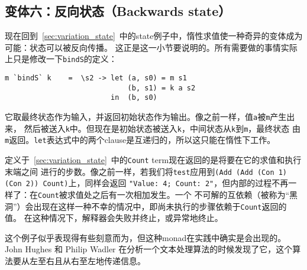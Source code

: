 \documentclass[12pt]{article}
\begin{document}
\subsection{变体六：反向状态（Backwards state）}
现在回到~\ref{sec:variation_state}~中的state例子中，惰性求值使一种奇异的变体成为可能：状态可以被反向传播。
这正是这一小节要说明的。所有需要做的事情实际上只是修改一下\texttt{bindS}的定义：
\begin{verbatim}
m `bindS` k    =  \s2 -> let (a, s0) = m s1
                             (b, s1) = k a s2
                         in  (b, s0)
\end{verbatim}
\noindent{}它取最终状态作为输入，并返回初始状态作为输出。像之前一样，值\texttt{a}被\texttt{m}产生出来，
然后被送入\texttt{k}中。但现在是初始状态被送入\texttt{k}，中间状态从\texttt{k}到\texttt{m}，最终状态
由\texttt{m}返回。\texttt{let}表达式中的两个clause是互递归的，所以这只能在惰性下工作。

\indent{}定义于~\ref{sec:variation_state}~中的\texttt{Count} term现在返回的是将要在它的求值和执行末端之间
进行的步数。像之前一样，若我们将\texttt{test}应用到\texttt{(Add (Add (Con 1) (Con 2)) Count)}上，同样会返回
\texttt{"Value: 4; Count: 2"}，但内部的过程不再一样了：在\texttt{Count}被求值处之后有一次相加发生。一个
不可解的互依赖（被称为“黑洞”）会出现在这样一种不幸的情况中，即尚未执行的步骤依赖于\texttt{Count}返回的值。
在这种情况下，解释器会失败并终止，或异常地终止。

\indent{}这个例子似乎表现得有些刻意而为，但这种monad在实践中确实是会出现的。John Hughes 和 Philip Wadler
在分析一个文本处理算法的时候发现了它，这个算法要从左至右且从右至左地传递信息。
\end{document}
